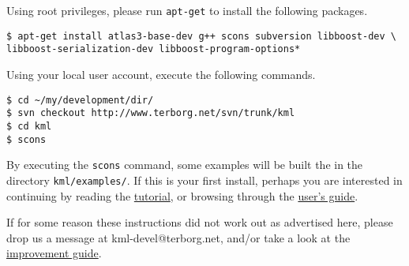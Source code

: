 \documentclass{article}
\begin{document}
Using root privileges, please run \texttt{apt-get} to install the following packages.
\begin{verbatim}
$ apt-get install atlas3-base-dev g++ scons subversion libboost-dev \ 
libboost-serialization-dev libboost-program-options*
\end{verbatim}
%
Using your local user account, execute the following commands.
\begin{verbatim}
$ cd ~/my/development/dir/
$ svn checkout http://www.terborg.net/svn/trunk/kml
$ cd kml
$ scons
\end{verbatim}
%
By executing the \texttt{scons} command, some examples will be built the in the directory \texttt{kml/examples/}.
If this is your first install, perhaps you are interested in continuing 
by reading the \href{\kmlroot/tutorial.html}{tutorial}, or browsing through 
the \href{\kmlroot/contents.html}{user's guide}.

If for some reason these instructions did not work out as advertised here,
please drop us a message at kml-devel@terborg.net, and/or take a look
at the \href{\kmlroot/improve.html}{improvement guide}.


% 
% 
% 
% 
\end{document}
